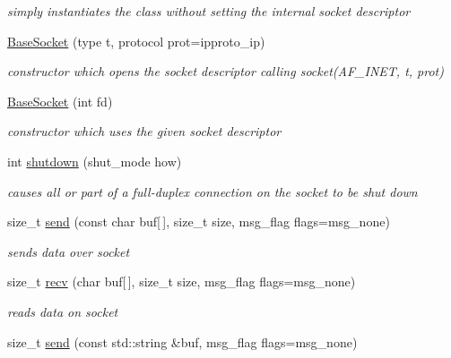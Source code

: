 \begin{CompactItemize}
\begin{CompactItemize}
\begin{CompactList}\small\item\em simply instantiates the class without setting the internal socket descriptor \item\end{CompactList}\item 
\hyperlink{classsocketpp_1_1BaseSocket_35c982d7aef2041c100439cf38aa7f4d}{BaseSocket} (type t, protocol prot=ipproto\_\-ip)
\begin{CompactList}\small\item\em constructor which opens the socket descriptor calling socket(AF\_\-INET, t, prot) \item\end{CompactList}\item 
\hyperlink{classsocketpp_1_1BaseSocket_f7e18d6700868abb2b476e797506eafb}{BaseSocket} (int fd)
\begin{CompactList}\small\item\em constructor which uses the given socket descriptor \item\end{CompactList}\item 
int \hyperlink{classsocketpp_1_1BaseSocket_7550a79d05baaf4b19c20fa0fa9bc8b9}{shutdown} (shut\_\-mode how)
\begin{CompactList}\small\item\em causes all or part of a full-duplex connection on the socket to be shut down \item\end{CompactList}\item 
size\_\-t \hyperlink{classsocketpp_1_1BaseSocket_a63e58c917c6be09f641f9ff1830e74a}{send} (const char buf\mbox{[}$\,$\mbox{]}, size\_\-t size, msg\_\-flag flags=msg\_\-none)
\begin{CompactList}\small\item\em sends data over socket \item\end{CompactList}\item 
size\_\-t \hyperlink{classsocketpp_1_1BaseSocket_d74160ecc96cacec56f61d36f9ab747d}{recv} (char buf\mbox{[}$\,$\mbox{]}, size\_\-t size, msg\_\-flag flags=msg\_\-none)
\begin{CompactList}\small\item\em reads data on socket \item\end{CompactList}\item 
size\_\-t \hyperlink{classsocketpp_1_1BaseSocket_8a5fa7a9374964d7978285a003301b9d}{send} (const std::string \&buf, msg\_\-flag flags=msg\_\-none)

\end{CompactItemize}
\end{CompactItemize}
